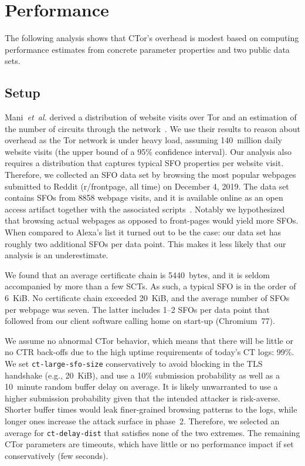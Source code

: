 \section{Performance} \label{sec:performance}
The following analysis shows that CTor's overhead is modest based on computing
performance estimates from concrete parameter properties and two public data
sets.

\subsection{Setup}
Mani~\emph{et~al.} derived a distribution of website visits over Tor and an
estimation of the number of circuits through the network~\cite{mani}.  We use
their results to reason about overhead as the Tor network is under heavy load,
assuming 140~million daily website visits (the upper bound of a 95\% confidence
interval).  Our analysis also requires a distribution that captures typical SFO
properties per website visit.  Therefore, we collected an SFO data set by
browsing the most popular webpages submitted to Reddit (r/frontpage, all time)
on December 4, 2019.  The data set contains SFOs from 8858 webpage visits, and
it is available online as an open access artifact together with the associated
scripts~\cite{sfo-dist}.  Notably we hypothesized that browsing actual webpages
as opposed to front-pages would yield more SFOs.  When compared to Alexa's
list it turned out to be the case:
	our data set has roughly two additional SFOs per data point.
This makes it less likely that our analysis is an underestimate.

We found that an average certificate chain is 5440~bytes, and it is seldom
accompanied by more than a few SCTs.  As such, a typical SFO is in the order of
6~KiB.  No certificate chain exceeded 20~KiB, and the average number of SFOs per
webpage was seven.  The latter includes 1--2 SFOs per data point that followed
from our client software calling home on start-up (Chromium~77).

We assume no abnormal CTor behavior, which means that there will be little or
no CTR back-offs due to the high uptime requirements of today's CT logs: 99\%.
We set \texttt{ct-large-sfo-size} conservatively to avoid blocking in the TLS
handshake (e.g., 20~KiB), and use a 10\% submission probability as well as a
10~minute random buffer delay on average.  It is likely unwarranted to use a
higher submission probability given that the intended attacker is risk-averse.
Shorter buffer times would leak finer-grained browsing patterns to the logs,
while longer ones increase the attack surface in phase~2.  Therefore, we
selected an average for \texttt{ct-delay-dist} that satisfies none of the two
extremes.  The remaining CTor parameters are timeouts, which have little or no
performance impact if set conservatively (few seconds).

